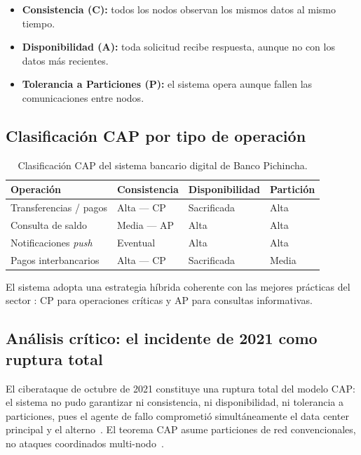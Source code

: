 \documentclass[12pt,a4paper]{article}
\begin{document}
\begin{itemize}[leftmargin=1.5cm]
  \item \textbf{Consistencia (C):} todos los nodos observan los mismos datos al mismo tiempo.
  \item \textbf{Disponibilidad (A):} toda solicitud recibe respuesta, aunque no con los datos m\'as recientes.
  \item \textbf{Tolerancia a Particiones (P):} el sistema opera aunque fallen las comunicaciones entre nodos.
\end{itemize}

\subsection{Clasificaci\'on CAP por tipo de operaci\'on}

\begin{table}[ht]
\centering
\caption{Clasificaci\'on CAP del sistema bancario digital de Banco Pichincha.}
\label{tab:cap}
\begin{tabularx}{\textwidth}{lXXX}
\toprule
\textbf{Operaci\'on} & \textbf{Consistencia} & \textbf{Disponibilidad} & \textbf{Partici\'on} \\
\midrule
Transferencias / pagos     & Alta --- CP   & Sacrificada & Alta \\
Consulta de saldo          & Media --- AP  & Alta        & Alta \\
Notificaciones \textit{push} & Eventual    & Alta        & Alta \\
Pagos interbancarios       & Alta --- CP   & Sacrificada & Media \\
\bottomrule
\end{tabularx}
\end{table}

El sistema adopta una estrategia h\'ibrida coherente con las mejores pr\'acticas del sector \cite{Mickoservicesbanking2025}: CP para operaciones cr\'iticas y AP para consultas informativas.

\subsection{An\'alisis cr\'itico: el incidente de 2021 como ruptura total}

\begin{tcolorbox}[colback=red!4, colframe=rojoAlerta,
                  title={\bfseries Caso Cr\'itico --- Octubre 2021: Ruptura del Modelo CAP}]
El ciberataque de octubre de 2021 constituye una ruptura total del modelo CAP: el sistema no pudo garantizar ni consistencia, ni disponibilidad, ni tolerancia a particiones, pues el agente de fallo comprometi\'o simult\'aneamente el data center principal y el alterno~\cite{SuperbancosIncidente2021}. El teorema CAP asume particiones de red convencionales, no ataques coordinados multi-nodo~\cite{GilbertLynch2002}.
\end{tcolorbox}
\end{document}
